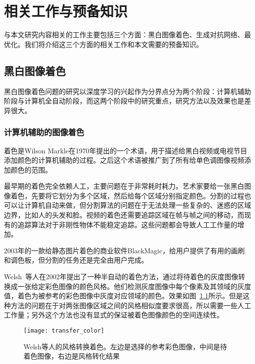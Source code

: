 \chapter{相关工作与预备知识}
\label{cha:related}

  与本文研究内容相关的工作主要包括三个方面：黑白图像着色、生成对抗网络、最优化。我们将介绍这三个方面的相关工作和本文需要的预备知识。

\section{黑白图像着色}
\label{sec:image-color}

  黑白图像着色问题的研究以深度学习的兴起作为分界点分为两个阶段：计算机辅助阶段与计算机全自动阶段，而这两个阶段中的研究重点，研究方法以及效果也是差异很大。

\subsection{计算机辅助的图像着色}
\label{sec:user-guided-color}
  
  着色是Wilson Markle在1970年提出的一个术语，用于描述给黑白视频或电视节目添加颜色的计算机辅助的过程。之后这个术语被推广到了所有给单色调图像视频添加颜色的范围。

  最早期的着色完全依赖人工，主要问题在于非常耗时耗力。艺术家要给一张黑白图像着色，先要将它划分为多个区域，然后给每个区域分别指定颜色。分割的过程也可以让计算机自动来做，但分割算法的问题在于无法处理一些复杂的、迷惑的区域边界，比如人的头发和脸。视频的着色还需要追踪区域在帧与帧之间的移动，而现有的追踪算法对于非刚性物体不能稳定追踪。这些问题都会导致人工工作量的增加。

  2003年的一款给静态图片着色的商业软件BlackMagic，给用户提供了有用的画刷和调色板，但分割的任务还是完全由用户完成。

  Welsh~\cite{DBLP:journals/tog/WelshAM02}等人在2002年提出了一种半自动的着色方法，通过将待着色的灰度图像转换成一张给定彩色图像的颜色风格。他们检测灰度图像中每个像素及其领域的灰度值，着色为被参考的彩色图像中灰度对应领域的颜色。效果如图~\ref{fig:transfer}所示。但是这种方法的问题在于对两张图像区域之间的风格相似度要求很高，所以需要一些人工工作量；另外这个方法也没有显式的保证被着色图像颜色的空间连续性。

  \begin{figure}[H]
    \centering
    \texttt{[image: transfer\_color]}
    \caption{Welsh等人的风格转换着色。左边是选择的参考彩色图像，中间是待着色图像，右边是风格转化结果}
    \label{fig:transfer}
  \end{figure}

